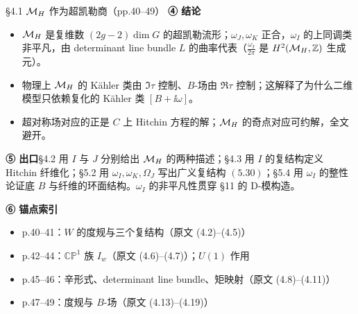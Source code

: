 \begin{kcard}{§4.1 $\mathcal{M}_H$ 作为超凯勒商（pp.40--49）}
\noindent\textbf{④ 结论}\quad
\begin{itemize}
\item $\mathcal{M}_H$ 是复维数 $(2g-2)\dim G$ 的超凯勒流形；$\omega_J,\omega_K$ 正合，$\omega_I$ 的上同调类非平凡，由 determinant line bundle $L$ 的曲率代表（$\frac{\omega_I}{2\pi}$ 是 $H^2(\mathcal{M}_H,\mathbb{Z})$ 生成元）。\pA{}
\item 物理上 $\mathcal{M}_H$ 的 Kähler 类由 $\Im\tau$ 控制、$B$-场由 $\Re\tau$ 控制；这解释了为什么二维模型只依赖复化的 Kähler 类 $[B+\ii\omega]$。\pA{}
\item 超对称场对应的正是 $C$ 上 Hitchin 方程的解；$\mathcal{M}_H$ 的奇点对应可约解，全文避开。\pA{}
\end{itemize}

\noindent\textbf{⑤ 出口}\quad \S4.2 用 $I$ 与 $J$ 分别给出 $\mathcal{M}_H$ 的两种描述；\S4.3 用 $I$ 的复结构定义 Hitchin 纤维化；\S5.2 用 $\omega_I,\omega_K,\Omega_J$ 写出广义复结构 $(5.30)$；\S5.4 用 $\omega_I$ 的整性论证底 $B$ 与纤维的环面结构。$\omega_I$ 的非平凡性贯穿 \S11 的 D-模构造。\pB{}

\noindent\textbf{⑥ 锚点索引}\quad
\begin{itemize}
\item p.40--41：$W$ 的度规与三个复结构（原文 (4.2)--(4.5)）
\item p.42--44：$\mathbb{CP}^1$ 族 $I_w$（原文 (4.6)--(4.7)）；$U(1)$ 作用
\item p.45--46：辛形式、determinant line bundle、矩映射（原文 (4.8)--(4.11)）
\item p.47--49：度规与 $B$-场（原文 (4.13)--(4.19)）
\end{itemize}
\end{kcard}

\noindent{}

\noindent{}

